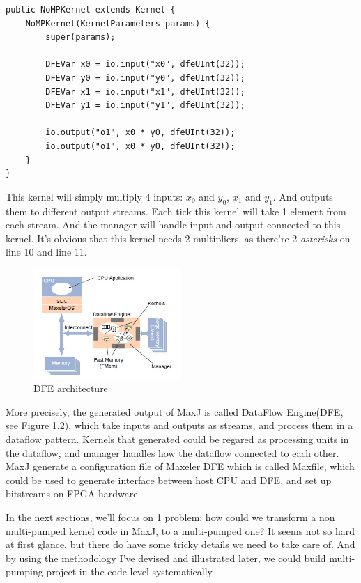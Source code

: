 \documentclass[a4paper, 10pt]{report}
\begin{document}
\begin{lstlisting}[caption=Non multi-pumped kernel example]
public NoMPKernel extends Kernel {
	NoMPKernel(KernelParameters params) {
		super(params);
		
		DFEVar x0 = io.input("x0", dfeUInt(32));
		DFEVar y0 = io.input("y0", dfeUInt(32));
		DFEVar x1 = io.input("x1", dfeUInt(32));
		DFEVar y1 = io.input("y1", dfeUInt(32));
		
		io.output("o1", x0 * y0, dfeUInt(32));
		io.output("o1", x0 * y0, dfeUInt(32));
	}
}
\end{lstlisting}

This kernel will simply multiply 4 inputs: $x_0$ and $y_0$, $x_1$ and $y_1$. And outputs them to different output streams. Each tick this kernel will take 1 element from each stream. And the manager will handle input and output connected to this kernel. It's obvious that this kernel needs 2 multipliers, as there're 2 \textit{asterisks} on line 10 and line 11.

\begin{figure}[h!]
  \caption{DFE architecture}
  \centering
    \includegraphics[width=0.5\textwidth]{dfe-arch}
\end{figure}

More precisely, the generated output of MaxJ is called DataFlow Engine(DFE, see Figure 1.2), which take inputs and outputs as streams, and process them in a dataflow pattern. Kernels that generated could be regared as processing units in the dataflow, and manager handles how the dataflow connected to each other. MaxJ generate a configuration file of Maxeler DFE which is called Maxfile, which could be used to generate interface between host CPU and DFE, and set up bitstreams on FPGA hardware.

In the next sections, we'll focus on 1 problem: how could we transform a non multi-pumped kernel code in MaxJ, to a multi-pumped one? It seems not so hard at first glance, but there do have some tricky details we need to take care of. And by using the methodology I've devised and illustrated later, we could build multi-pumping project in the code level systematically
\end{document}
